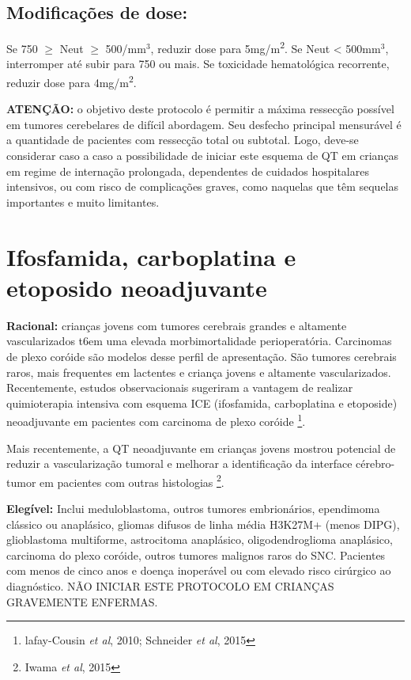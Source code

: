 \documentclass[11pt,a4paper,oldfontcommands]{memoir}
\begin{document}
\subsection{Modificações de dose:}
Se 750 $\geq$ Neut $\geq$ 500/mm\(^3\), reduzir dose para 5mg/m\textsuperscript{2}. Se Neut < 500mm\(^3\), interromper até subir para 750 ou mais. Se toxicidade hematológica recorrente, reduzir dose para 4mg/m\textsuperscript{2}.

\textbf{ATENÇÃO:} o objetivo deste protocolo é permitir a máxima ressecção possível em tumores cerebelares de difícil abordagem. Seu desfecho principal mensurável é a quantidade de pacientes com ressecção total ou subtotal. Logo, deve-se considerar caso a caso a possibilidade de iniciar este esquema de QT em crianças em regime de internação prolongada, dependentes de cuidados hospitalares intensivos, ou com risco de complicações graves, como naquelas que têm sequelas importantes e muito limitantes.
\clearpage

\section{Ifosfamida, carboplatina e etoposido neoadjuvante}
{\let\thefootnote\relax{}}
\textbf{Racional:} crianças jovens com tumores cerebrais grandes e altamente vascularizados t6em uma elevada morbimortalidade perioperatória. Carcinomas de plexo coróide são modelos desse perfil de apresentação. São tumores cerebrais raros, mais frequentes em lactentes e criança jovens e altamente vascularizados. Recentemente, estudos observacionais sugeriram a vantagem de realizar quimioterapia intensiva com esquema ICE (ifosfamida, carboplatina e etoposide) neoadjuvante em pacientes com carcinoma de plexo coróide \footnote{lafay-Cousin \textit{et al}, 2010; Schneider \textit{et al}, 2015}.

Mais recentemente, a QT neoadjuvante em crianças jovens mostrou potencial de reduzir a vascularização tumoral e melhorar a identificação da interface cérebro-tumor em pacientes com outras histologias \footnote{Iwama \textit{et al}, 2015}.

\textbf{Elegível:} Inclui meduloblastoma, outros tumores embrionários, ependimoma clássico ou anaplásico, gliomas difusos de linha média H3K27M+ (menos DIPG), glioblastoma multiforme, astrocitoma anaplásico, oligodendroglioma anaplásico, carcinoma do plexo coróide, outros tumores malignos raros do SNC. Pacientes com menos de cinco anos e doença inoperável ou com elevado risco cirúrgico ao diagnóstico. NÃO INICIAR ESTE PROTOCOLO EM CRIANÇAS GRAVEMENTE ENFERMAS.
\end{document}

